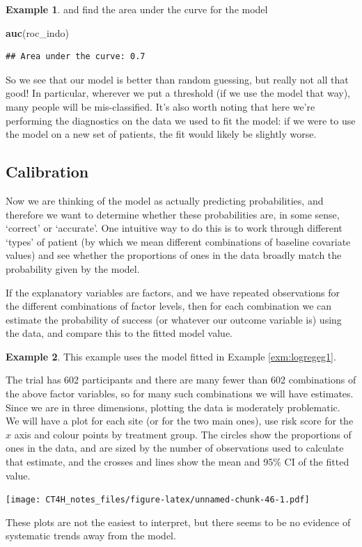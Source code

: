 \documentclass[
  openany]{book}
\newenvironment{Shaded}{\begin{snugshade}}{\end{snugshade}}
\newcommand{\FunctionTok}[1]{\textcolor[rgb]{0.13,0.29,0.53}{\textbf{#1}}}
\newcommand{\NormalTok}[1]{#1}
\theoremstyle{definition}
\theoremstyle{definition}
\newtheorem{example}{Example}[chapter]
\theoremstyle{definition}
\theoremstyle{definition}
\theoremstyle{remark}
\begin{document}
\begin{example}
and find the area under the curve for the model

\begin{Shaded}
\begin{Highlighting}[]
\FunctionTok{auc}\NormalTok{(roc\_indo)}
\end{Highlighting}
\end{Shaded}

\begin{verbatim}
## Area under the curve: 0.7
\end{verbatim}

So we see that our model is better than random guessing, but really not all that good! In particular, wherever we put a threshold (if we use the model that way), many people will be mis-classified. It's also worth noting that here we're performing the diagnostics on the data we used to fit the model: if we were to use the model on a new set of patients, the fit would likely be slightly worse.
\end{example}

\hypertarget{calibration}{%
\subsection{Calibration}\label{calibration}}

Now we are thinking of the model as actually predicting probabilities, and therefore we want to determine whether these probabilities are, in some sense, `correct' or `accurate'. One intuitive way to do this is to work through different `types' of patient (by which we mean different combinations of baseline covariate values) and see whether the proportions of ones in the data broadly match the probability given by the model.

If the explanatory variables are factors, and we have repeated observations for the different combinations of factor levels, then for each combination we can estimate the probability of success (or whatever our outcome variable is) using the data, and compare this to the fitted model value.

\begin{example}
This example uses the model fitted in Example \ref{exm:logregeg1}.

The trial has 602 participants and there are many fewer than 602 combinations of the above factor variables, so for many such combinations we will have estimates. Since we are in three dimensions, plotting the data is moderately problematic. We will have a plot for each site (or for the two main ones), use risk score for the \(x\) axis and colour points by treatment group. The circles show the proportions of ones in the data, and are sized by the number of observations used to calculate that estimate, and the crosses and lines show the mean and 95\% CI of the fitted value.

\texttt{[image: CT4H\_notes\_files/figure-latex/unnamed-chunk-46-1.pdf]}

These plots are not the easiest to interpret, but there seems to be no evidence of systematic trends away from the model.
\end{example}
\end{document}
